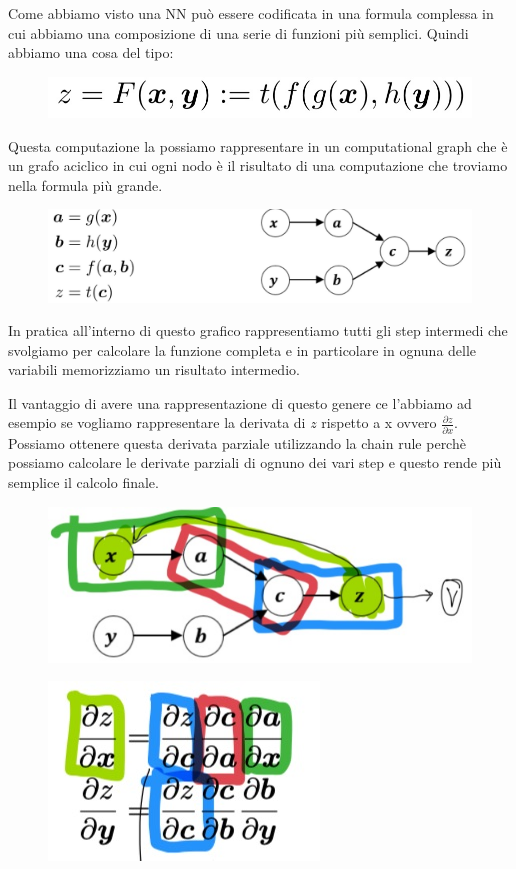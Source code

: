 \documentclass[14pt]{extreport}
\begin{document}
Come abbiamo visto una NN può essere codificata in una formula complessa in cui abbiamo una composizione di una serie di funzioni più semplici. Quindi
abbiamo una cosa del tipo:
\begin{figure}[H]
\centering
\includegraphics[width=0.5\linewidth]{384.jpeg}
\end{figure}

Questa computazione la possiamo rappresentare in un computational graph che è un grafo aciclico in cui ogni nodo è il risultato di una computazione
che troviamo nella formula più grande.

\begin{figure}[H]
\centering
\includegraphics[width=0.5\linewidth]{385.jpeg}
\end{figure}

In pratica all'interno di questo grafico rappresentiamo tutti gli step intermedi che svolgiamo per calcolare la funzione completa e in particolare in
ognuna delle variabili memorizziamo un risultato intermedio.

Il vantaggio di avere una rappresentazione di questo genere ce l'abbiamo ad esempio se vogliamo rappresentare la derivata di $z$ rispetto a x ovvero
$\frac{\partial z}{\partial x}$. Possiamo ottenere questa derivata parziale utilizzando la chain rule perchè possiamo calcolare le derivate parziali
di ognuno dei vari step e questo rende più semplice il calcolo finale.
\begin{figure}[H]
\centering
\includegraphics[width=0.5\linewidth]{386.jpeg}
\end{figure}
\begin{figure}[H]
\centering
\includegraphics[width=0.2\linewidth]{387.jpeg}
\end{figure}
\end{document}
